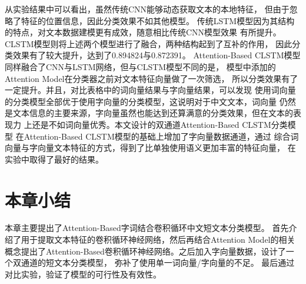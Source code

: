 从实验结果中可以看出，虽然传统CNN能够动态获取文本的本地特征，
但由于忽略了特征的位置信息，因此分类效果不如其他模型。
传统LSTM模型因为其结构的特点，对文本数据建模更有成效，随意相比传统CNN模型效果
有所提升。CLSTM模型则将上述两个模型进行了融合，两种结构起到了互补的作用，
因此分类效果有了较大提升，达到了0.894824与0.872391。
Attention-Based CLSTM模型同样融合了CNN与LSTM网络，但与CLSTM模型不同的是，
模型中添加的Attention Model在分类器之前对文本特征向量做了一次筛选，
所以分类效果有了一定提升。并且，对比表格中的词向量结果与字向量结果，可以发现
使用词向量的分类模型全部优于使用字向量的分类模型，这说明对于中文文本，词向量
仍然是文本信息的主要来源，字向量虽然也能达到还算满意的分类效果，但在文本的表现力
上还是不如词向量优秀。本文设计的双通道Attention-Based CLSTM分类模型
在Attention-Based CLSTM模型的基础上增加了字向量数据通道，通过
综合词向量与字向量文本特征的方式，得到了比单独使用语义更加丰富的特征向量，
在实验中取得了最好的结果。
\section{本章小结}
本章主要提出了Attention-Based字词结合卷积循环中文短文本分类模型。
首先介绍了用于提取文本特征的卷积循环神经网络，然后再结合Attention Model的相关
概念提出了Attention-Based卷积循环神经网络。之后加入字向量数据，设计了一个双通道的短文本分类模型，
弥补了使用单一词向量/字向量的不足。
最后通过对比实验，验证了模型的可行性及有效性。